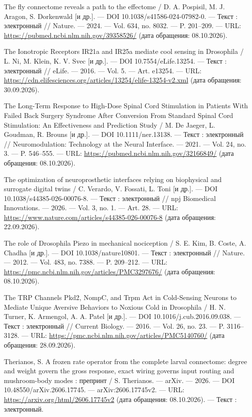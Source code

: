 \begin{list}{}{\setlength{\leftmargin}{10mm}\setlength{\labelwidth}{8mm}\setlength{\labelsep}{2mm}\setlength{\itemsep}{0pt}\setlength{\parsep}{0pt}\setlength{\topsep}{0pt}}
\item[275.] The fly connectome reveals a path to the effectome / D. A. Pospisil, M. J. Aragon, S. Dorkenwald [и др.]. — DOI 10.1038/s41586-024-07982-0. — Текст : электронный // Nature. — 2024. — Vol. 634, no. 8032. — P. 201–209. — URL: \url{https://pubmed.ncbi.nlm.nih.gov/39358526/} (дата обращения: 08.10.2026).
\item[276.] The Ionotropic Receptors IR21a and IR25a mediate cool sensing in Drosophila / L. Ni, M. Klein, K. V. Svec [и др.]. — DOI 10.7554/eLife.13254. — Текст : электронный // eLife. — 2016. — Vol. 5. — Art. e13254. — URL: \url{https://cdn.elifesciences.org/articles/13254/elife-13254-v2.xml} (дата обращения: 30.09.2026).
\item[277.] The Long-Term Response to High-Dose Spinal Cord Stimulation in Patients With Failed Back Surgery Syndrome After Conversion From Standard Spinal Cord Stimulation: An Effectiveness and Prediction Study / M. De Jaeger, L. Goudman, R. Brouns [и др.]. — DOI 10.1111/ner.13138. — Текст : электронный // Neuromodulation: Technology at the Neural Interface. — 2021. — Vol. 24, no. 3. — P. 546–555. — URL: \url{https://pubmed.ncbi.nlm.nih.gov/32166849/} (дата обращения: 08.10.2026).
\item[278.] The optimization of neuroprosthetic interfaces relying on biophysical and surrogate digital twins / C. Verardo, V. Fossati, L. Toni [и др.]. — DOI 10.1038/s44385-026-00076-8. — Текст : электронный // npj Biomedical Innovations. — 2026. — Vol. 3, no. 1. — Art. 28. — URL: \url{https://www.nature.com/articles/s44385-026-00076-8} (дата обращения: 22.09.2026).
\item[279.] The role of Drosophila Piezo in mechanical nociception / S. E. Kim, B. Coste, A. Chadha [и др.]. — DOI 10.1038/nature10801. — Текст : электронный // Nature. — 2012. — Vol. 483, no. 7388. — P. 209–212. — URL: \url{https://pmc.ncbi.nlm.nih.gov/articles/PMC3297676/} (дата обращения: 08.10.2026).
\item[280.] The TRP Channels Pkd2, NompC, and Trpm Act in Cold-Sensing Neurons to Mediate Unique Aversive Behaviors to Noxious Cold in Drosophila / H. N. Turner, K. Armengol, A. A. Patel [и др.]. — DOI 10.1016/j.cub.2016.09.038. — Текст : электронный // Current Biology. — 2016. — Vol. 26, no. 23. — P. 3116–3128. — URL: \url{https://pmc.ncbi.nlm.nih.gov/articles/PMC5140760/} (дата обращения: 28.09.2026).
\item[281.] Therianos, S. A frozen rate operator from the complete larval connectome: degree and weight govern the gross response, exact wiring governs input routing and mushroom-body modes : препринт / S. Therianos. — arXiv. — 2026. — DOI 10.48550/arXiv.2606.17745. — arXiv:2606.17745v2. — URL: \url{https://arxiv.org/html/2606.17745v2} (дата обращения: 08.10.2026). — Текст : электронный.

\end{list}
